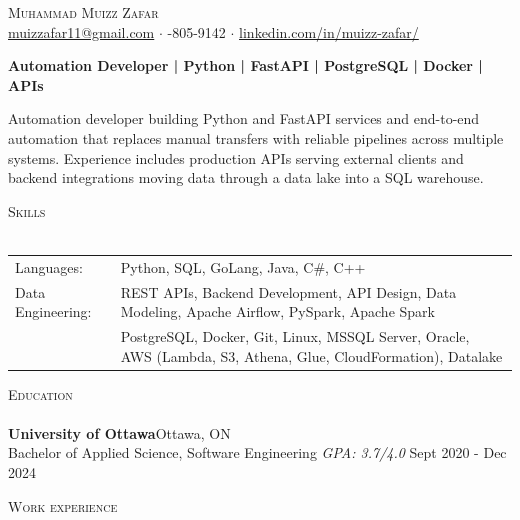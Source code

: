\documentclass[a4paper]{article}
\newcommand{\lineunder} {
    \vspace*{-8pt} \\
    \hspace*{-18pt} \hrulefill \\
}
\newcommand{\header} [1] {
    {\hspace*{-18pt}\vspace*{6pt} \textsc{#1}}
    \vspace*{-6pt} \lineunder
}
\begin{document}
\vspace*{-40pt}

\vspace*{-10pt}
\begin{center}
	{\Huge \scshape {Muhammad Muizz Zafar}}\\
	\faSend \space \href{mailto:muizzafar11@gmail.com}{muizzafar11@gmail.com} $\cdot$ \faPhoneSquare {}-805-9142 $\cdot$ \faLinkedinSquare \space \href{https://www.linkedin.com/in/muizz-zafar/}{linkedin.com/in/muizz-zafar/}
	\\
\end{center}

\vspace{-5pt}
\begin{center}
\textbf{Automation Developer | Python | FastAPI | PostgreSQL | Docker | APIs}
\end{center}
\begin{center}
Automation developer building Python and FastAPI services and end-to-end automation that replaces manual transfers with reliable pipelines across multiple systems. Experience includes production APIs serving external clients and backend integrations moving data through a data lake into a SQL warehouse.
\end{center}

\header{Skills}
\begin{tabular}{ l l }
	Languages: 
& Python, SQL, GoLang, Java, C\#, C++ \\

Data Engineering: 
& REST APIs, Backend Development, API Design, Data Modeling, Apache Airflow, PySpark, Apache Spark\\
& PostgreSQL, Docker, Git, Linux, MSSQL Server, Oracle, AWS (Lambda, S3, Athena, Glue, CloudFormation), Datalake

\end{tabular}

\header{Education}
\textbf{University of Ottawa}\hfill Ottawa, ON\\
Bachelor of Applied Science, Software Engineering \textit{GPA: 3.7/4.0} \hfill Sept 2020 - Dec 2024\\
\vspace{2mm}

\header{Work experience}
\vspace{1.5mm}
\end{document}
